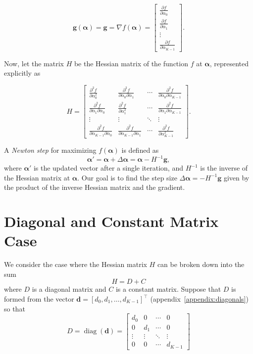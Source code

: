 \documentclass[twoside]{article}
\begin{document}
\renewcommand*{\arraystretch}{2}
\[
    \boldsymbol{g}(\boldsymbol{\alpha}) = \boldsymbol{g} = \nabla f(\boldsymbol{\alpha}) =\begin{bmatrix}
        \frac{\partial f}{\partial \alpha_0} \\
        \frac{\partial f}{\partial \alpha_1} \\
        \vdots \\
        \frac{\partial f}{\partial \alpha_{K-1}}
    \end{bmatrix}.
\]

Now, let the matrix $H$ be the Hessian matrix of the function $f$ at $\boldsymbol{\alpha}$, represented explicitly as

\renewcommand*{\arraystretch}{2}
\[
    H =
    \begin{bmatrix}
        \frac{\partial^2 f}{\partial \alpha_0^2} & \frac{\partial^2 f}{\partial \alpha_0 \partial \alpha_1} & \cdots & \frac{\partial^2 f}{\partial \alpha_0 \partial \alpha_{K-1}} \\
        \frac{\partial^2 f}{\partial \alpha_1 \partial \alpha_0} & \frac{\partial^2 f}{\partial \alpha_1^2} & \cdots & \frac{\partial^2 f}{\partial \alpha_1 \partial \alpha_{K-1}} \\
        \vdots & \vdots & \ddots & \vdots \\
        \frac{\partial^2 f}{\partial \alpha_{K-1} \partial \alpha_0} & \frac{\partial^2 f}{\partial \alpha_{K-1} \partial \alpha_1} & \cdots & \frac{\partial^2 f}{\partial \alpha_{K-1}^2}
    \end{bmatrix}.
\]

A \textit{Newton step} for maximizing $f(\boldsymbol{\alpha})$ is defined as
\[
    \boldsymbol{\alpha'} = \boldsymbol{\alpha} + \Delta \boldsymbol{\alpha} = \boldsymbol{\alpha} - H^{-1}\boldsymbol{g},
\]
where $\boldsymbol{\alpha'}$ is the updated vector after a single iteration, and $H^{-1}$ is the inverse of the Hessian matrix at $\boldsymbol{\alpha}$. Our goal is to find the step size $\Delta \boldsymbol{\alpha} = -H^{-1}\boldsymbol{g}$ given by the product of the inverse Hessian matrix and the gradient.

\section{Diagonal and Constant Matrix Case}

We consider the case where the Hessian matrix $H$ can be broken down into the sum \[H = D + C\] where $D$ is a diagonal matrix and $C$ is a constant matrix. Suppose that $D$ is formed from the vector $\boldsymbol{d} = [d_0, d_1, \dots, d_{K-1}]^\top$ (appendix~\ref{appendix:diagonals}) so that
\renewcommand*{\arraystretch}{1.5}
\[
    D = \operatorname{diag}(\boldsymbol{d}) =
    \begin{bmatrix}
        d_0 & 0 & \cdots & 0 \\
        0 & d_1 & \cdots & 0 \\
        \vdots & \vdots & \ddots & \vdots \\
        0 & 0 & \cdots & d_{K-1}
    \end{bmatrix}
\]
\end{document}
